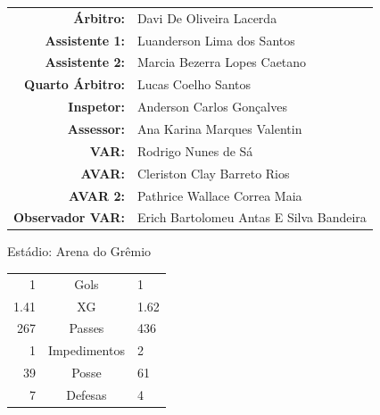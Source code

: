 \documentclass[11pt]{article}
\begin{document}
\vspace{0.5cm}
\begin{minipage}{0.65\textwidth}
\begin{center}
\begin{tabular}{rl}
\textbf{Árbitro:} & Davi De Oliveira Lacerda \\
\textbf{Assistente 1:} & Luanderson Lima dos Santos \\
\textbf{Assistente 2:} & Marcia Bezerra Lopes Caetano \\
\textbf{Quarto Árbitro:} & Lucas Coelho Santos \\
\textbf{Inspetor:} & Anderson Carlos Gonçalves \\
\textbf{Assessor:} & Ana Karina Marques Valentin \\
\textbf{VAR:} & Rodrigo Nunes de Sá \\
\textbf{AVAR:} & Cleriston Clay Barreto Rios \\
\textbf{AVAR 2:} & Pathrice Wallace Correa Maia \\
\textbf{Observador VAR:} & Erich Bartolomeu Antas E Silva Bandeira \\
\end{tabular}
\end{center}
\end{minipage}
\begin{minipage}{0.3\textwidth}
Estádio: Arena do Grêmio\\
\begin{tabular}{rcl}
1 & Gols & 1 \\
1.41 & XG & 1.62 \\
267 & Passes & 436 \\
1 & Impedimentos & 2 \\
39 & Posse & 61 \\
7 & Defesas & 4 \\
\end{tabular}
\end{minipage}
\newpage
\end{document}
